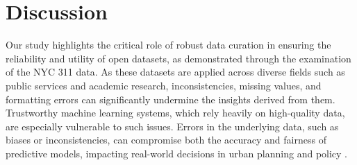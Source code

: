 \documentclass[linenumber]{jdsart}
\begin{document}





\section{Discussion} \label{sec:discussion}

Our study highlights the critical role of robust data curation in
ensuring the reliability and utility of open datasets, as demonstrated
through the examination of the NYC 311 data. As these datasets are
applied across diverse fields such as public services and academic
research, inconsistencies, missing values, and formatting errors can
significantly undermine the insights derived from them. Trustworthy
machine learning systems, which rely heavily on high-quality data, are
especially vulnerable to such issues. Errors in the underlying data,
such as biases or inconsistencies, can compromise both the accuracy
and fairness of predictive models, impacting real-world decisions in
urban planning and policy \citep{rahm2000data, geiger2020garbage}.
\end{document}
